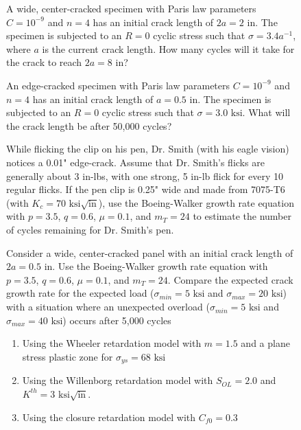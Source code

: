 \documentclass[12pt, oneside]{article}
\begin{document}
\begin{enumerate}

\begin{figure}[H]
	\item A wide, center-cracked specimen with Paris law parameters $C=10^{-9}$ and $n=4$ has an initial crack length of $2a = 2 \text{ in}$. 
	The specimen is subjected to an $R=0$ cyclic stress such that $\sigma = 3.4a^{-1}$, where $a$ is the current crack length. 
	How many cycles will it take for the crack to reach $2a = 8 \text{ in}$?
\end{figure}

\begin{figure}[H]
	\item An edge-cracked specimen with Paris law parameters $C=10^{-9}$ and $n=4$ has an initial crack length of $a = 0.5 \text{ in}$. 
	The specimen is subjected to an $R=0$ cyclic stress such that $\sigma = 3.0 \text{ ksi}$.
	What will the crack length be after 50,000 cycles?
\end{figure}

\begin{figure}[H]
	\item While flicking the clip on his pen, Dr. Smith (with his eagle vision) notices a 0.01" edge-crack.
	Assume that Dr. Smith's flicks are generally about 3 in-lbs, with one strong, 5 in-lb flick for every 10 regular flicks.
	If the pen clip is 0.25" wide and made from 7075-T6 (with $K_c = 70 \text{ ksi}\sqrt{\text{in}}$), use the Boeing-Walker growth rate equation with $p=3.5$, $q=0.6$, $\mu=0.1$, and $m_T = 24$ to estimate the number of cycles remaining for Dr. Smith's pen.
\end{figure}

\begin{figure}[H]
	\item Consider a wide, center-cracked panel with an initial crack length of $2a = 0.5 \text{ in}$.
	Use the Boeing-Walker growth rate equation with $p=3.5$, $q=0.6$, $\mu=0.1$, and $m_T = 24$.
	Compare the expected crack growth rate for the expected load ($\sigma_{min} = 5 \text{ ksi}$ and $\sigma_{max} = 20 \text{ ksi}$) with a situation where an unexpected overload ($\sigma_{min} = 5 \text{ ksi}$ and $\sigma_{max} = 40 \text{ ksi}$) occurs after 5,000 cycles
	\begin{enumerate}
		\item Using the Wheeler retardation model with $m = 1.5$ and a plane stress plastic zone for $\sigma_{ys} = 68 \text{ ksi}$
		\item Using the Willenborg retardation model with $S_{OL} = 2.0$ and $K^{th} = 3 \text{ ksi}\sqrt{\text{in}}$.
		\item Using the closure retardation model with $C_{f0} = 0.3$
	\end{enumerate}
\end{figure}

\end{enumerate}
\end{document}
